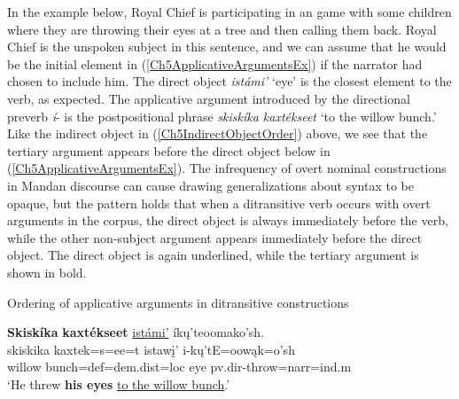 In the example below, Royal Chief is participating in an game with some children where they are throwing their eyes at a tree and then calling them back. Royal Chief is the unspoken subject in this sentence, and we can assume that he would be the initial element in (\ref{Ch5ApplicativeArgumentsEx}) if the narrator had chosen to include him. The direct object \textit{istámi'} `eye' is the closest element to the verb, as expected. The applicative argument introduced by the directional preverb \textit{í}- is the postpositional phrase \textit{skiskíka kaxtékseet} `to the willow bunch.' Like the indirect object in (\ref{Ch5IndirectObjectOrder}) above, we see that the tertiary argument appears before the direct object below in (\ref{Ch5ApplicativeArgumentsEx}). The infrequency of overt nominal constructions in Mandan discourse can cause drawing generalizations about syntax to be opaque, but the pattern holds that when a ditransitive verb occurs with overt arguments in the corpus, the direct object is always immediately before the verb, while the other non-subject argument appears immediately before the direct object. The direct object is again underlined, while the tertiary argument is shown in bold.

\begin{exe}
    \item\label{Ch5ApplicativeArgumentsEx} Ordering of applicative arguments in ditransitive constructions

    \glll \textbf{Skiskíka} \textbf{kaxtékseet} \uline{istámi'} íkų'teoomako'sh.\\
    skiskika kaxtek=s=ee=t istawį' i-kų'tE=oowąk=o'sh\\
    \textnormal{willow} \textnormal{bunch}=def=dem.dist=loc \textnormal{eye} pv.dir-\textnormal{throw}=narr=ind.m\\
    \glt `He threw \textbf{his eyes} \uline{to the willow bunch}.' \citep[34]{hollow1973a}
\end{exe}

